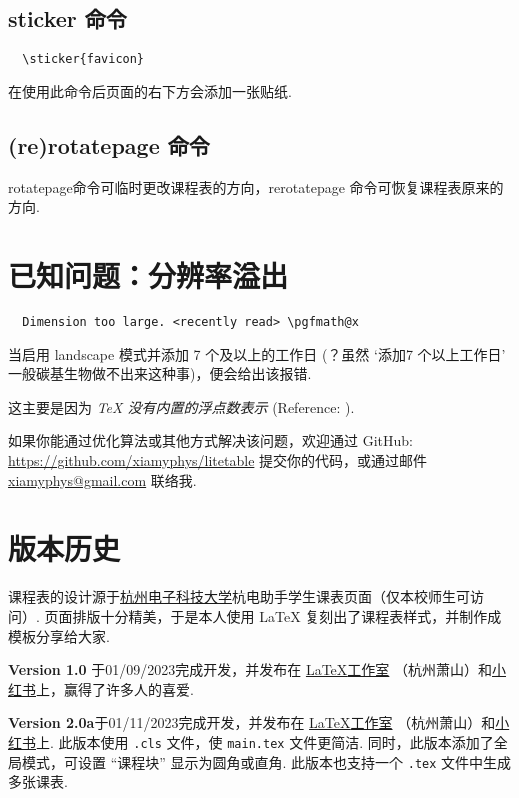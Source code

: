 \documentclass[11pt]{article}
\def\mode#1{\texorpdfstring{\textcolor{moducolor}{\textsf{#1}}}{“#1”}}
\def\cmd#1{\texorpdfstring{\textcolor{cmdcolor}{\textsf{#1}}}{“#1”}}
\begin{document}
\subsection{\cmd{sticker} 命令}
\begin{verbatim}
  \sticker{favicon}
\end{verbatim}
在使用此命令后页面的右下方会添加一张贴纸.

\subsection{\cmd{(re)rotatepage} 命令}
\cmd{rotatepage}命令可临时更改课程表的方向，\cmd{rerotatepage} 命令可恢复课程表原来的方向.

\section{已知问题：分辨率溢出}
\begin{verbatim}
  Dimension too large. <recently read> \pgfmath@x
\end{verbatim}

当启用 \mode{landscape} 模式并添加 7 个及以上的工作日 (？虽然 `添加7 个以上工作日' 一般碳基生物做不出来这种事)，便会给出该报错.

这主要是因为 \emph{\textsf{\TeX} 没有内置的浮点数表示} (Reference: ).

如果你能通过优化算法或其他方式解决该问题，欢迎通过 GitHub: \url{https://github.com/xiamyphys/litetable} 提交你的代码，或通过邮件 \href{mail:xiamyphys@gmail.com}{\ttfamily xiamyphys@gmail.com} 联络我.

\section{版本历史}

课程表的设计源于\href{https://www.hdu.edu.cn}{杭州电子科技大学}杭电助手学生课表页面（仅本校师生可访问）. 页面排版十分精美，于是本人使用 \textsf{\LaTeX{}} 复刻出了课程表样式，并制作成模板分享给大家.

\textsf{\bfseries Version 1.0} 于01/09/2023完成开发，并发布在 \href{https://www.latexstudio.net/index/details/index/mid/3625.html}{\textsf{\LaTeX}工作室} （杭州萧山）和\href{http://xhslink.com/od7Ycw}{小红书}上，赢得了许多人的喜爱.

\textsf{\bfseries Version 2.0a}于01/11/2023完成开发，并发布在 \href{https://www.latexstudio.net/index/details/index/mid/3636.html}{\textsf{\LaTeX}工作室} （杭州萧山）和\href{http://xhslink.com/od7Ycw}{小红书}上. 此版本使用 \verb|.cls| 文件，使 \verb|main.tex| 文件更简洁. 同时，此版本添加了全局模式，可设置 ``课程块'' 显示为圆角或直角. 此版本也支持一个 \verb|.tex| 文件中生成多张课表.
\end{document}
